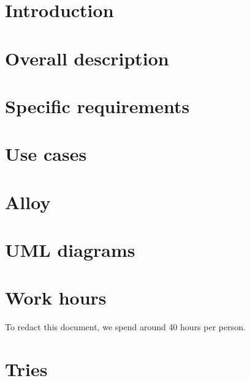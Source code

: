 \tableofcontents

\chapter{Introduction}


\chapter{Overall description}


\chapter{Specific requirements}


\begin{appendices}
\chapter{Use cases}


\chapter{Alloy}


\chapter{UML diagrams}


\chapter{Work hours}
To redact this document, we spend around 40 hours per person.

\chapter{Tries}
%    
%
%

\end{appendices}

